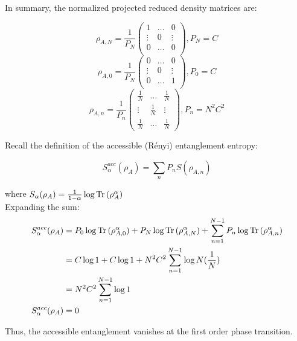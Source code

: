 In summary, the normalized projected reduced density matrices are:

\begin{equation}
\rho_{A,N} = \frac{1}{P_{N}} \begin{pmatrix}
1 & \dots & 0 \\ 
\vdots & 0 & \vdots \\
0 & \dots & 0 \\
\end{pmatrix}, P_{N}=C 
\end{equation}
\begin{equation}
 \rho_{A,0} = \frac{1}{P_{N}} \begin{pmatrix}
0 & \dots & 0 \\ 
\vdots & 0 & \vdots \\
0 & \dots & 1 \\
\end{pmatrix}, P_{0}=C 
\end{equation}
\begin{equation}
\rho_{A,n} = \frac{1}{P_{n}} \begin{pmatrix}
\frac{1}{N} & \dots & \frac{1}{N} \\ 
\vdots & \frac{1}{N} & \vdots \\
\frac{1}{N} & \dots & \frac{1}{N}
\end{pmatrix}, P_{n}=N^2C^2 
\end{equation}

Recall the definition of the accessible (R\'enyi) entanglement entropy:

\[S_{\alpha}^{acc}(\rho_{A}) = \sum_{n} P_{n}S(\rho_{A,n})\]

where $S_{\alpha}(\rho_A) = \frac{1}{1-\alpha} \log{\operatorname{Tr}{(\rho_A^{\alpha})}}$
\\

Expanding the sum:
\begin{align}
S_{\alpha}^{acc}(\rho_{A}) &= P_{0} \log{\operatorname{Tr}{(\rho_{A,0}^{\alpha})}} + P_{N} \log{\operatorname{Tr}{(\rho_{A,N}^{\alpha})}} + \sum_{n=1}^{N-1} P_{n} \log{\operatorname{Tr}{(\rho_{A,n}^{\alpha})}} \nonumber \\
&= C \log{1} + C \log{1} + N^2C^2 \sum_{n=1}^{N-1} \log{N(\frac{1}{N})}  \nonumber \\
&= N^2C^2 \sum_{n=1}^{N-1} \log{1} \nonumber \\
S_{\alpha}^{acc}(\rho_{A}) &= 0 
\end{align}

Thus, the accessible entanglement vanishes at the first order phase transition. \\

